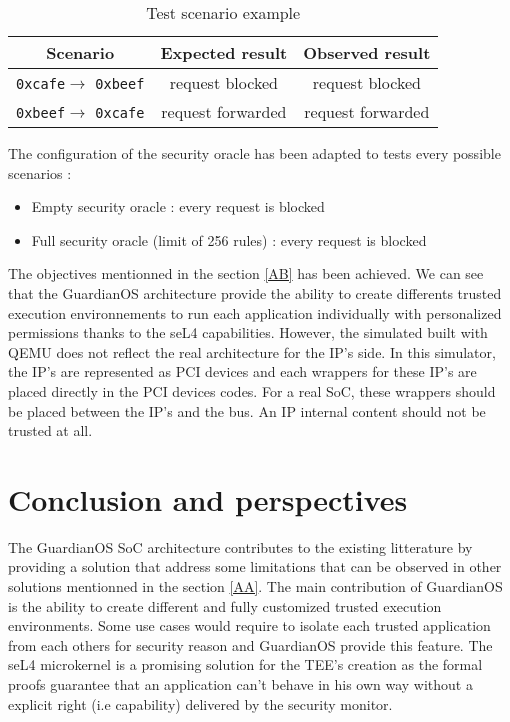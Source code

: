 \documentclass[conference]{IEEEtran}
\begin{document}
\begin{table}[h]
    \centering
    \begin{tabular}{|c|c|c|}
        \hline
        Scenario & Expected result & Observed result \\
        \hline
        \texttt{0xcafe}$\rightarrow$ \texttt{0xbeef} & request blocked & request blocked \\
        \texttt{0xbeef}$\rightarrow$ \texttt{0xcafe} & request forwarded & request forwarded \\
        \hline
    \end{tabular}
    \vspace{5pt}
    \caption{Test scenario example}
    \label{tab:rules}
\end{table}

The configuration of the security oracle has been adapted to tests every possible scenarios : 

\begin{itemize}
    \item Empty security oracle : every request is blocked
    \item Full security oracle (limit of 256 rules) : every request is blocked
\end{itemize}

The objectives mentionned in the section \ref{AB} has been achieved. We can see that the GuardianOS architecture provide the ability to create differents 
trusted execution environnements to run each application individually with personalized permissions thanks to the seL4 capabilities. However, the simulated built with QEMU does not reflect the real architecture for the IP's side. In this simulator, the IP's are represented as PCI devices and each wrappers for these IP's are placed directly in the PCI devices codes. For a real SoC, these wrappers should be placed between the IP's and the bus. An IP internal content should not be trusted at all.

\section{Conclusion and perspectives}
The GuardianOS SoC architecture contributes to the existing litterature by providing a solution that address some limitations that can be observed in other solutions mentionned in the section \ref{AA}. The main contribution of GuardianOS is the ability to create different and fully customized trusted execution environments. Some use cases would require to isolate each trusted application from each others for security reason and GuardianOS provide this feature. The seL4 microkernel is a promising solution for the TEE's creation as the formal proofs guarantee that an application can't behave in his own way without a explicit right (i.e capability) delivered by the security monitor. 
\end{document}
